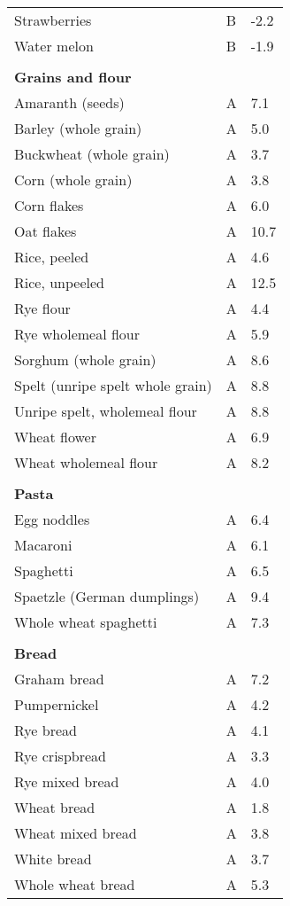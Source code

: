 \documentclass[../main.tex]{subfiles}
\begin{document}
\begin{longtable}{p{7cm}p{0.5cm}p{1cm}}
Strawberries  & B  & -2.2 \\
Water melon  & B  & -1.9 \\
 \\
\multicolumn{3}{l}{\textbf{Grains and flour}}  \\
Amaranth (seeds)  & A  & 7.1 \\
Barley (whole grain)  & A  & 5.0 \\
Buckwheat (whole grain)  & A  & 3.7 \\
Corn (whole grain)  & A  & 3.8 \\
Corn flakes  & A  & 6.0 \\
Oat flakes  & A  & 10.7 \\
Rice, peeled  & A  & 4.6 \\
Rice, unpeeled  & A  & 12.5 \\
Rye flour  & A  & 4.4 \\
Rye wholemeal flour  & A  & 5.9 \\
Sorghum (whole grain)  & A  & 8.6 \\
Spelt (unripe spelt whole grain)  & A  & 8.8 \\
Unripe spelt, wholemeal flour  & A  & 8.8 \\
Wheat flower  & A  & 6.9 \\
Wheat wholemeal flour  & A  & 8.2 \\
 \\
\multicolumn{3}{l}{\textbf{Pasta}}  \\
Egg noddles   & A  & 6.4 \\
Macaroni  & A  & 6.1 \\
Spaghetti  & A  & 6.5 \\
Spaetzle (German dumplings)  & A  & 9.4 \\
Whole wheat spaghetti  & A  & 7.3 \\
 \\
\multicolumn{3}{l}{\textbf{Bread}} \\
Graham bread  & A  & 7.2 \\
Pumpernickel  & A  & 4.2 \\
Rye bread  & A  & 4.1 \\
Rye crispbread  & A  & 3.3 \\
Rye mixed bread  & A  & 4.0 \\
Wheat bread  & A  & 1.8 \\
Wheat mixed bread  & A  & 3.8 \\
White bread  & A  & 3.7 \\
Whole wheat bread  & A  & 5.3 \\

\end{longtable}
\end{document}
